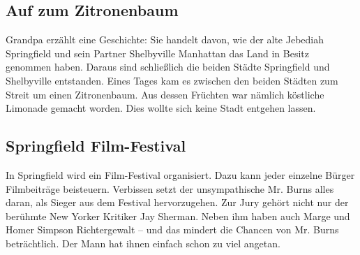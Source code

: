 	
\subsection{Auf zum Zitronenbaum}\label{2F22}
Grandpa erzählt eine Geschichte: Sie handelt davon, wie der alte Jebediah Springfield und sein Partner Shelbyville Manhattan das Land in Besitz genommen haben. Daraus sind schließlich die beiden Städte Springfield und Shelbyville entstanden. Eines Tages kam es zwischen den beiden Städten zum Streit um einen Zitronenbaum. Aus dessen Früchten war nämlich köstliche Limonade gemacht worden. Dies wollte sich keine Stadt entgehen lassen.

	
\subsection{Springfield Film-Festival}\label{2F31}
In Springfield wird ein Film-Festival organisiert. Dazu kann jeder einzelne Bür\-ger Film\-bei\-trä\-ge bei\-steu\-ern. Verbissen setzt der unsympathische Mr. Burns alles daran, als Sieger aus dem Festival hervorzugehen. Zur Jury gehört nicht nur der berühmte New Yorker Kritiker Jay Sherman. Neben ihm haben auch Marge und Homer Simpson Richtergewalt -- und das mindert die Chancen von Mr. Burns beträchtlich. Der Mann hat ihnen einfach schon zu viel angetan.

